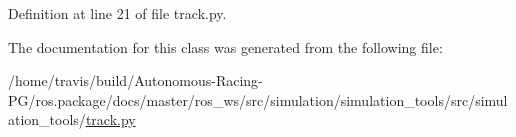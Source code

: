 Definition at line 21 of file track.\+py.



The documentation for this class was generated from the following file\+:\begin{DoxyCompactItemize}
\item 
/home/travis/build/\+Autonomous-\/\+Racing-\/\+P\+G/ros.\+package/docs/master/ros\+\_\+ws/src/simulation/simulation\+\_\+tools/src/simulation\+\_\+tools/\hyperlink{track_8py}{track.\+py}\end{DoxyCompactItemize}
